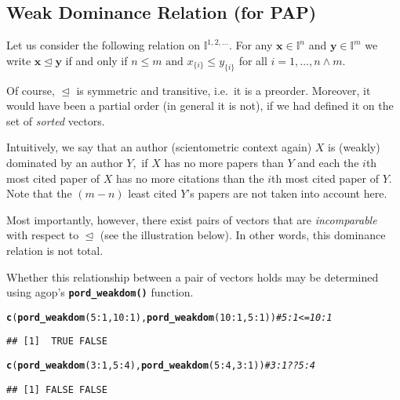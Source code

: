 \documentclass[11pt]{article}\usepackage[]{graphicx}\usepackage[]{color}
\makeatletter
\newcommand{\hlnum}[1]{\textcolor[rgb]{0.686,0.059,0.569}{#1}}%
\newcommand{\hlcom}[1]{\textcolor[rgb]{0.678,0.584,0.686}{\textit{#1}}}%
\newcommand{\hlopt}[1]{\textcolor[rgb]{0,0,0}{#1}}%
\newcommand{\hlstd}[1]{\textcolor[rgb]{0.345,0.345,0.345}{#1}}%
\newcommand{\hlkwd}[1]{\textcolor[rgb]{0.737,0.353,0.396}{\textbf{#1}}}%
\newenvironment{kframe}{%
 \def\at@end@of@kframe{}%
 \ifinner\ifhmode%
  \def\at@end@of@kframe{\end{minipage}}%
  \begin{minipage}{\columnwidth}%
 \fi\fi%
 \def\FrameCommand##1{\hskip\@totalleftmargin \hskip-\fboxsep
 \colorbox{shadecolor}{##1}\hskip-\fboxsep
     \hskip-\linewidth \hskip-\@totalleftmargin \hskip\columnwidth}%
 \MakeFramed {\advance\hsize-\width
   \@totalleftmargin\z@ \linewidth\hsize
   \@setminipage}}%
 {\par\unskip\endMakeFramed%
 \at@end@of@kframe}
\newenvironment{knitrout}{}{} %
\newcommand{\package}[1]{\textsf{#1}\xspace}
\newcommand{\Rfunc}[1]{\texttt{\hlkwd{#1}}}
\newcommand{\vect}[1]{{\mathbf{#1}}}
\newcommand{\IvalPow}[1]{\mathbb{I}^{#1}}
\newcommand{\AnyPow}{^{1,2,\dots}}
\newcommand{\IvalAnyPow}{\mathbb{I}\AnyPow}
\theoremstyle{remark}
\theoremstyle{definition}
\makeatother
\begin{document}
\subsection{Weak Dominance Relation (for PAP)}

Let us consider the following relation on $\IvalAnyPow$.
For any $\vect{x}\in\IvalPow{n}$ and $\vect{y}\in\IvalPow{m}$ we write
$\vect{x}\trianglelefteq\vect{y}$ if and only if
$n\le m\text{ and }x_{\{i\}}\le y_{\{i\}}$ for all $i=1,\dots,n\wedge m$.

Of course, $\trianglelefteq$ is symmetric
and transitive, i.e.~it is a preorder.
Moreover, it would have been a partial order (in general it is not),
if we had defined it on the set
of \textit{sorted} vectors.



Intuitively, we  say that an author (scientometric
context again) $X$
 is (weakly) dominated %
by an author $Y,$ if $X$ has no more papers than $Y$ and each
the $i$th most cited paper of $X$ has no more citations than
the $i$th most cited paper of $Y$. Note that the $(m-n)$ least cited
$Y$'s papers are not taken into account here.

Most importantly, however,
there exist pairs of vectors
that are \textit{incomparable} with respect to $\trianglelefteq$ (see
the illustration below).
In other words, this dominance relation is not total.

Whether this relationship between a pair of vectors holds may be
determined using \package{agop}'s
\index{\Rfunc{pord\_weakdom()}}\Rfunc{pord\_weakdom()}
function.

\begin{knitrout}\small
{}\color{fgcolor}\begin{kframe}
\begin{alltt}
\hlkwd{c}\hlstd{(}\hlkwd{pord_weakdom}\hlstd{(}\hlnum{5}\hlopt{:}\hlnum{1}\hlstd{,} \hlnum{10}\hlopt{:}\hlnum{1}\hlstd{),} \hlkwd{pord_weakdom}\hlstd{(}\hlnum{10}\hlopt{:}\hlnum{1}\hlstd{,} \hlnum{5}\hlopt{:}\hlnum{1}\hlstd{))} \hlcom{# 5:1 <= 10:1}
\end{alltt}
\begin{verbatim}
## [1]  TRUE FALSE
\end{verbatim}
\begin{alltt}
\hlkwd{c}\hlstd{(}\hlkwd{pord_weakdom}\hlstd{(}\hlnum{3}\hlopt{:}\hlnum{1}\hlstd{,} \hlnum{5}\hlopt{:}\hlnum{4}\hlstd{),}  \hlkwd{pord_weakdom}\hlstd{(}\hlnum{5}\hlopt{:}\hlnum{4}\hlstd{,} \hlnum{3}\hlopt{:}\hlnum{1}\hlstd{))}  \hlcom{# 3:1 ?? 5:4}
\end{alltt}
\begin{verbatim}
## [1] FALSE FALSE
\end{verbatim}
\end{kframe}
\end{knitrout}
\end{document}
